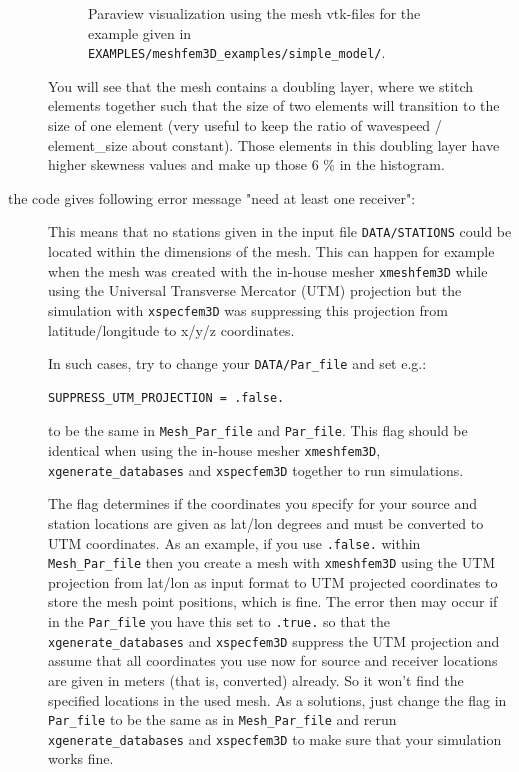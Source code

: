 \begin{description}
\begin{figure}[htbp]
\caption{Paraview visualization using the mesh vtk-files for the example given
in \texttt{EXAMPLES/meshfem3D\_examples/simple\_model/}.}


\label{fig:mesh.vp}
\end{figure}



You will see that the mesh contains a doubling layer, where we stitch
elements together such that the size of two elements will transition
to the size of one element (very useful to keep the ratio of wavespeed
/ element\_size about constant). Those elements in this doubling layer
have higher skewness values and make up those 6 \% in the histogram.

\item [{the code gives following error message "need at least one receiver":}] This
means that no stations given in the input file \texttt{DATA/STATIONS}
could be located within the dimensions of the mesh. This can happen
for example when the mesh was created with the in-house mesher \texttt{xmeshfem3D}
while using the Universal Transverse Mercator (UTM) projection but
the simulation with \texttt{xspecfem3D} was suppressing this projection
from latitude/longitude to x/y/z coordinates.


In such cases, try to change your \texttt{DATA/Par\_file} and set
e.g.:
\begin{verbatim}
SUPPRESS_UTM_PROJECTION = .false.
\end{verbatim}
to be the same in \texttt{Mesh\_Par\_file} and \texttt{Par\_file}.
This flag should be identical when using the in-house mesher \texttt{xmeshfem3D},
\texttt{xgenerate\_databases} and \texttt{xspecfem3D} together to
run simulations.


The flag determines if the coordinates you specify for your source
and station locations are given as lat/lon degrees and must be converted
to UTM coordinates. As an example, if you use \texttt{.false.} within
\texttt{Mesh\_Par\_file} then you create a mesh with \texttt{xmeshfem3D}
using the UTM projection from lat/lon as input format to UTM projected
coordinates to store the mesh point positions, which is fine. The
error then may occur if in the \texttt{Par\_file} you have this set
to \texttt{.true.} so that the \texttt{xgenerate\_databases} and \texttt{xspecfem3D}
suppress the UTM projection and assume that all coordinates you use
now for source and receiver locations are given in meters (that is,
converted) already. So it won't find the specified locations in the
used mesh. As a solutions, just change the flag in \texttt{Par\_file}
to be the same as in \texttt{Mesh\_Par\_file} and rerun \texttt{xgenerate\_databases}
and \texttt{xspecfem3D} to make sure that your simulation works fine.


\end{description}
